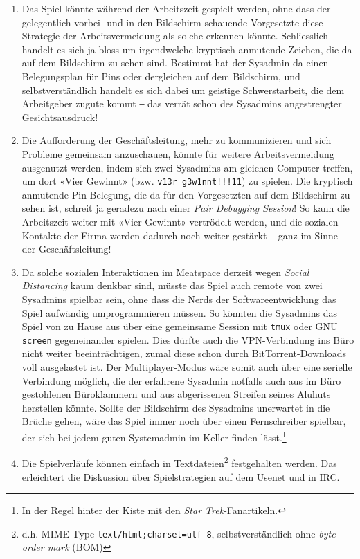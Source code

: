 \documentclass[a4paper,11pt,hidelinks]{scrartcl}
\begin{document}
\begin{enumerate}
    \item Das Spiel könnte während der Arbeitszeit gespielt werden, ohne dass der gelegentlich vorbei- und in den Bildschirm schauende Vorgesetzte diese Strategie der Arbeitsvermeidung als solche erkennen könnte. Schliesslich handelt es sich ja bloss um irgendwelche kryptisch anmutende Zeichen, die da auf dem Bildschirm zu sehen sind. Bestimmt hat der Sysadmin da einen Belegungsplan für Pins oder dergleichen auf dem Bildschirm, und selbstverständlich handelt es sich dabei um geistige Schwerstarbeit, die dem Arbeitgeber zugute kommt ‒ das verrät schon des Sysadmins angestrengter Gesichtsausdruck!
    \item Die Aufforderung der Geschäftsleitung, mehr zu kommunizieren und sich Probleme gemeinsam anzuschauen, könnte für weitere Arbeitsvermeidung ausgenutzt werden, indem sich zwei Sysadmins am gleichen Computer treffen, um dort «Vier Gewinnt» (bzw. \texttt{v13r g3w1nnt!!!11}) zu spielen. Die kryptisch anmutende Pin-Be\-le\-gung, die da für den Vorgesetzten auf dem Bildschirm zu sehen ist, schreit ja geradezu nach einer \textit{Pair Debugging Session}! So kann die Arbeitszeit weiter mit «Vier Gewinnt» vertrödelt werden, und die sozialen Kontakte der Firma werden dadurch noch weiter gestärkt ‒ ganz im Sinne der Geschäftsleitung!
    \item Da solche sozialen Interaktionen im Meatspace derzeit wegen \textit{Social Distancing} kaum denkbar sind, müsste das Spiel auch remote von zwei Sysadmins spielbar sein, ohne dass die Nerds der Softwareentwicklung das Spiel aufwändig umprogrammieren müssen. So könnten die Sysadmins das Spiel von zu Hause aus über eine gemeinsame Session mit \texttt{tmux} oder GNU \texttt{screen} gegeneinander spielen. Dies dürfte auch die VPN-Verbindung ins Büro nicht weiter beeinträchtigen, zumal diese schon durch BitTorrent-Downloads voll ausgelastet ist. Der Multiplayer-Modus wäre somit auch über eine serielle Verbindung möglich, die der erfahrene Sysadmin notfalls auch aus im Büro gestohlenen Büroklammern und aus abgerissenen Streifen seines Aluhuts herstellen könnte. Sollte der Bildschirm des Sysadmins unerwartet in die Brüche gehen, wäre das Spiel immer noch über einen Fernschreiber spielbar, der sich bei jedem guten Systemadmin im Keller finden lässt.\footnote{In der Regel hinter der Kiste mit den \textit{Star Trek}-Fanartikeln.}
    \item Die Spielverläufe können einfach in Textdateien\footnote{d.h. MIME-Type \texttt{text/html;charset=utf-8}, selbstverständlich ohne \textit{byte order mark} (BOM)} festgehalten werden. Das erleichtert die Diskussion über Spielstrategien auf dem Usenet und in IRC.
\end{enumerate}
\end{document}
